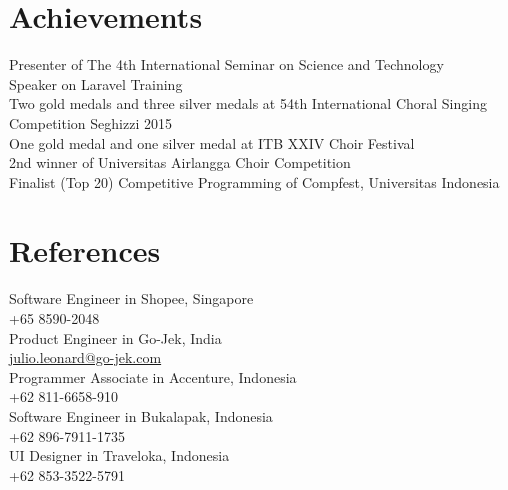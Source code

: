 \documentclass[letterpaper]{deedy-resume} %
\begin{document}
\newpage %
\begin{minipage}[t]{0.39\textwidth}


\section{Achievements}
  Presenter of The 4th International Seminar on Science and Technology \\
  Speaker on Laravel Training \\
  Two gold medals and three silver medals at 54th International Choral Singing Competition Seghizzi 2015 \\
  One gold medal and one silver medal at ITB XXIV Choir Festival \\
  2nd winner of Universitas Airlangga Choir Competition \\
  Finalist (Top 20) Competitive Programming of Compfest, Universitas Indonesia \\
\sectionspace


\section{References}
  Software Engineer in Shopee, Singapore\\
  +65 8590-2048\\
  Product Engineer in Go-Jek, India\\
  \href{mailto:julio.leonard@go-jek.com}{julio.leonard@go-jek.com}\\
  Programmer Associate in Accenture, Indonesia\\
  +62 811-6658-910\\
  Software Engineer in Bukalapak, Indonesia\\
  +62 896-7911-1735\\
  UI Designer in Traveloka, Indonesia\\
  +62 853-3522-5791\\

\end{minipage} %
\end{document}
